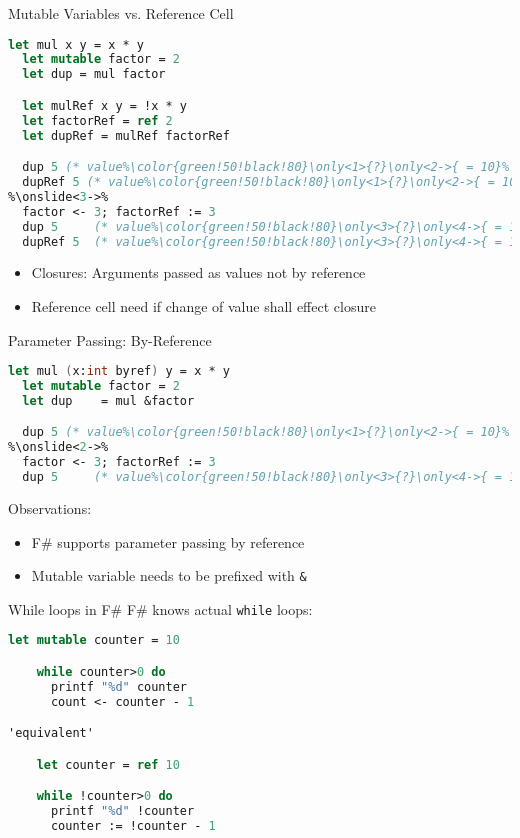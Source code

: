\documentclass{beamer}
\begin{document}
\begin{frame}[fragile]{Mutable Variables vs. Reference Cell}

\begin{lstlisting}[language=FSharp, escapechar=\%]
  let mul x y = x * y
  let mutable factor = 2
  let dup = mul factor

  let mulRef x y = !x * y
  let factorRef = ref 2
  let dupRef = mulRef factorRef

  dup 5 (* value%\color{green!50!black!80}\only<1>{?}\only<2->{ = 10}% *)
  dupRef 5 (* value%\color{green!50!black!80}\only<1>{?}\only<2->{ = 10}% *)
%\onslide<3->% 
  factor <- 3; factorRef := 3
  dup 5     (* value%\color{green!50!black!80}\only<3>{?}\only<4->{ = 10}% *)
  dupRef 5  (* value%\color{green!50!black!80}\only<3>{?}\only<4->{ = 15}% *)
\end{lstlisting}


\begin{itemize}
\item<4-> Closures: Arguments passed as values not by reference
\item<4-> Reference cell need if change of value shall effect closure
\end{itemize}
\end{frame}

\begin{frame}[fragile]{Parameter Passing: By-Reference}

\begin{lstlisting}[language=FSharp, escapechar=\%]
  let mul (x:int byref) y = x * y
  let mutable factor = 2
  let dup    = mul &factor

  dup 5 (* value%\color{green!50!black!80}\only<1>{?}\only<2->{ = 10}% *)
%\onslide<2->% 
  factor <- 3; factorRef := 3
  dup 5     (* value%\color{green!50!black!80}\only<3>{?}\only<4->{ = 15}% *)
\end{lstlisting}

Observations:
\begin{itemize}
\item F\# supports parameter passing by reference
\item Mutable variable needs to be prefixed with \lstinline{&}
\end{itemize}
\end{frame}

\begin{frame}[fragile]{While loops in F\#}
  F\# knows actual \lstinline!while! loops:

\begin{lstlisting}[language=FSharp, escapechar=\']
    let mutable counter = 10 

    while counter>0 do
      printf "%d" counter
      count <- counter - 1

'equivalent'

    let counter = ref 10 

    while !counter>0 do
      printf "%d" !counter
      counter := !counter - 1
\end{lstlisting}

\end{frame}
\end{document}
